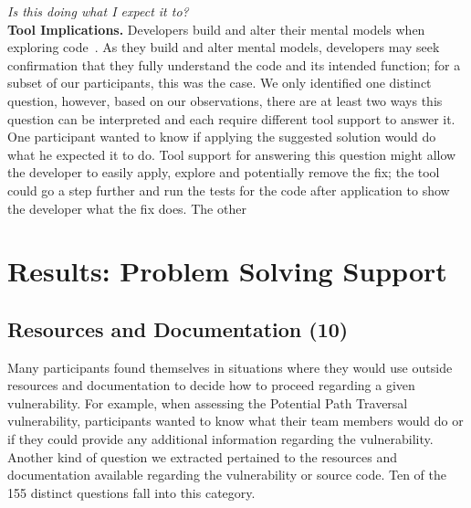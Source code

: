 \documentclass[conference]{IEEEtran}
\begin{document}

% 

\noindent\emph{Is this doing what I expect it to?} \\

\noindent\textbf{Tool Implications.} Developers build and alter their mental models when exploring code~\cite{canas1994mental, burkhardt1997mental}. 
As they build and alter mental models, developers may seek confirmation that they fully understand the code and its intended function; for a subset of our participants, this was the case. 
We only identified one distinct question, however, based on our observations, there are at least two ways this question can be interpreted and each require different tool support to answer it.
One participant wanted to know if applying the suggested solution would do what he expected it to do. 
Tool support for answering this question might allow the developer to easily apply, explore and potentially remove the fix; the tool could go a step further and run the tests for the code after application to show the developer what the fix does.
The other 



\section{Results: Problem Solving Support}
\label{sec:results-pss}



\noindent\subsection{\textbf{Resources and Documentation (10)}}\label{rd}

Many participants found themselves in situations where they would use outside resources and documentation to decide how to proceed regarding a given vulnerability.
For example, when assessing the Potential Path Traversal vulnerability, participants wanted to know what their team members would do or if they could provide any additional information regarding the vulnerability. 
Another kind of question we extracted pertained to the resources and documentation available regarding the vulnerability or source code. 
Ten of the 155 distinct questions fall into this category. 
\\
\end{document}
